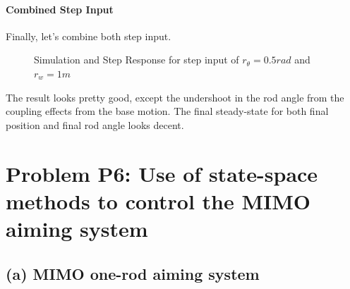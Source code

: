 \documentclass{tron}
\begin{document}
\paragraph{Combined Step Input}
Finally, let's combine both step input.
\begin{figure}[H]
	\centering
	 \quad
	\caption{Simulation and Step Response for step input of $r_{\theta}=0.5\unit{rad}$ and $r_{w}=1\unit{m}$}
	\label{fig:p5:P3_aug:sim:both}
\end{figure}

The result looks pretty good, except the undershoot in the rod angle from the coupling effects from the base motion. The final steady-state for both final position and final rod angle looks decent.

\newpage
\section{Problem P6: Use of state-space methods to control the MIMO aiming system}
\subsection{(a) MIMO one-rod aiming system \label{ans:P6-a}}
\end{document}
